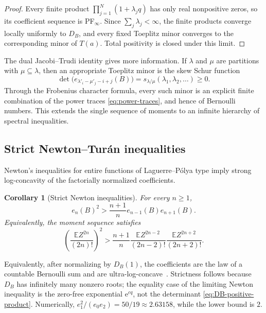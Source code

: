 \documentclass[11pt,oneside]{article}
\newtheorem{corollary}[theorem]{Corollary}
\theoremstyle{definition}
\newcommand{\e}{\mathrm e}
\newcommand{\E}{\mathbb E}
\begin{document}
\begin{proof}
Every finite product \(\prod_{j=1}^{N}(1+\lambda_jq)\) has only real nonpositive
zeros, so its coefficient sequence is PF\(_\infty\).  Since
\(\sum_j\lambda_j<\infty\), the finite products converge locally uniformly to
\(D_B\), and every fixed Toeplitz minor converges to the corresponding minor of
\(T(a)\).  Total positivity is closed under this limit.
\end{proof}

The dual Jacobi--Trudi identity gives more information.  If \(\lambda\) and \(\mu\)
are partitions with \(\mu\subseteq\lambda\), then an appropriate Toeplitz minor is the
skew Schur function
\begin{equation}
 \det\bigl(e_{\lambda'_i-\mu'_j-i+j}(B)\bigr)
 =s_{\lambda/\mu}(\lambda_1,\lambda_2,\ldots)\ge0.
 \label{eq:Schur-minors}
\end{equation}
Through the Frobenius character formula, every such minor is an explicit finite
combination of the power traces \eqref{eq:power-traces}, and hence of Bernoulli
numbers.  This extends the single sequence of moments to an infinite hierarchy of
spectral inequalities.

\subsection{Strict Newton--Tur\'an inequalities}

Newton's inequalities for entire functions of Laguerre--P\'olya type imply strong
log-concavity of the factorially normalized coefficients.

\begin{corollary}[Strict Newton inequalities]
\label{cor:Newton}
For every \(n\ge1\),
\begin{equation}
 \boxed{\quad
 e_n(B)^2>\frac{n+1}{n}e_{n-1}(B)e_{n+1}(B).
 \quad}
 \label{eq:strict-Newton}
\end{equation}
Equivalently, the moment sequence satisfies
\begin{equation}
 \left(\frac{\E Z^{2n}}{(2n)!}\right)^2
 >\frac{n+1}{n}
 \frac{\E Z^{2n-2}}{(2n-2)!}
 \frac{\E Z^{2n+2}}{(2n+2)!}.
 \label{eq:moment-Turan}
\end{equation}
\end{corollary}

Equivalently, after normalizing by \(D_B(1)\), the coefficients are the law of a
countable Bernoulli sum and are ultra-log-concave~\cite{Liggett1997}.
Strictness follows because \(D_B\) has infinitely many nonzero roots; the equality
case of the limiting Newton inequality is the zero-free exponential
\(\e^{cq}\), not the determinant \eqref{eq:DB-positive-product}.  Numerically,
\(e_1^2/(e_0e_2)=50/19\approx2.63158\), while the lower bound is \(2\).
\end{document}
